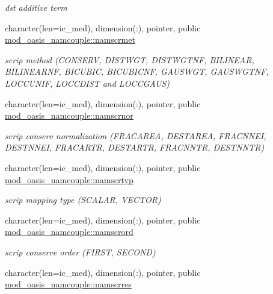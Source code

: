 \begin{DoxyCompactItemize}
\begin{DoxyCompactList}\small\item\em dst additive term \end{DoxyCompactList}\item 
character(len=ic\+\_\+med), dimension(\+:), pointer, public \hyperlink{namespacemod__oasis__namcouple_a51c19e0892a72acc3dca2adb046ed175}{mod\+\_\+oasis\+\_\+namcouple\+::namscrmet}
\begin{DoxyCompactList}\small\item\em scrip method (C\+O\+N\+S\+E\+RV, D\+I\+S\+T\+W\+GT, D\+I\+S\+T\+W\+G\+T\+NF, B\+I\+L\+I\+N\+E\+AR, B\+I\+L\+I\+N\+E\+A\+R\+NF, B\+I\+C\+U\+B\+IC, B\+I\+C\+U\+B\+I\+C\+NF, G\+A\+U\+S\+W\+GT, G\+A\+U\+S\+W\+G\+T\+NF, L\+O\+C\+C\+U\+N\+IF, L\+O\+C\+C\+D\+I\+ST and L\+O\+C\+C\+G\+A\+US) \end{DoxyCompactList}\item 
character(len=ic\+\_\+med), dimension(\+:), pointer, public \hyperlink{namespacemod__oasis__namcouple_a392f40531007d5dcc084e6ad4a393fd7}{mod\+\_\+oasis\+\_\+namcouple\+::namscrnor}
\begin{DoxyCompactList}\small\item\em scrip conserv normalization (F\+R\+A\+C\+A\+R\+EA, D\+E\+S\+T\+A\+R\+EA, F\+R\+A\+C\+N\+N\+EI, D\+E\+S\+T\+N\+N\+EI, F\+R\+A\+C\+A\+R\+TR, D\+E\+S\+T\+A\+R\+TR, F\+R\+A\+C\+N\+N\+TR, D\+E\+S\+T\+N\+N\+TR) \end{DoxyCompactList}\item 
character(len=ic\+\_\+med), dimension(\+:), pointer, public \hyperlink{namespacemod__oasis__namcouple_a8ddbaabd22bbf485888b1df5f3578909}{mod\+\_\+oasis\+\_\+namcouple\+::namscrtyp}
\begin{DoxyCompactList}\small\item\em scrip mapping type (S\+C\+A\+L\+AR, V\+E\+C\+T\+OR) \end{DoxyCompactList}\item 
character(len=ic\+\_\+med), dimension(\+:), pointer, public \hyperlink{namespacemod__oasis__namcouple_ac881ced105604879ada860fabd677481}{mod\+\_\+oasis\+\_\+namcouple\+::namscrord}
\begin{DoxyCompactList}\small\item\em scrip conserve order (F\+I\+R\+ST, S\+E\+C\+O\+ND) \end{DoxyCompactList}\item 
character(len=ic\+\_\+med), dimension(\+:), pointer, public \hyperlink{namespacemod__oasis__namcouple_a6a95ddbbbc615e0257d93d05e4546239}{mod\+\_\+oasis\+\_\+namcouple\+::namscrres}

\end{DoxyCompactItemize}
